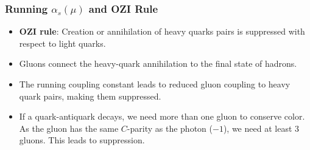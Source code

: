 \subsubsection{Running $α_s(μ)$ and OZI Rule}   
\begin{itemize}
    \item \textbf{OZI rule}: Creation or annihilation of heavy quarks pairs is suppressed with respect to light quarks. 
    \item Gluons connect the heavy-quark annihilation to the final state of hadrons. 
    \item The running coupling constant leads to reduced gluon coupling to heavy quark pairs, making them suppressed. 
    \item If a quark-antiquark decays, we need more than one gluon to conserve color. As the gluon has the same $C$-parity as the photon ($-1$), we need at least 3 gluons. This leads to suppression. 
\end{itemize}





